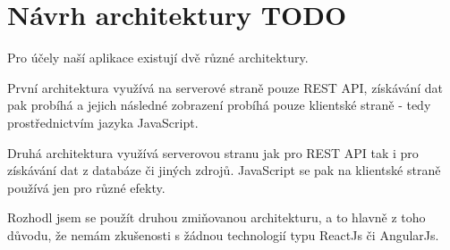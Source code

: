 \section{Návrh architektury TODO}
Pro účely naší aplikace existují dvě různé architektury.

První architektura využívá na serverové straně pouze REST API, získávání dat pak probíhá a jejich následné zobrazení probíhá pouze klientské straně - tedy prostřednictvím jazyka JavaScript.

Druhá architektura využívá serverovou stranu jak pro REST API tak i pro získávání dat z databáze či jiných zdrojů. JavaScript se pak na klientské straně používá jen pro různé efekty.

Rozhodl jsem se použít druhou zmiňovanou architekturu, a to hlavně z toho důvodu, že nemám zkušenosti s žádnou technologií typu ReactJs či AngularJs.
